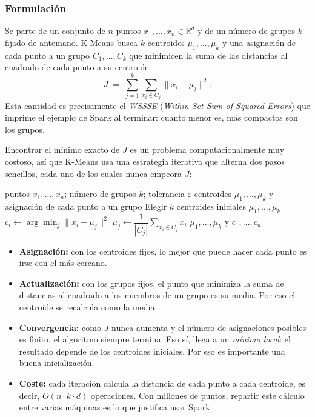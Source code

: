 \documentclass[11pt,a4paper]{article}
\begin{document}
\subsubsection*{Formulación}

Se parte de un conjunto de $n$ puntos $x_1,\dots,x_n \in \mathbb{R}^d$ y de un número de grupos $k$ fijado de antemano. K-Means busca $k$ centroides $\mu_1,\dots,\mu_k$ y una asignación de cada punto a un grupo $C_1,\dots,C_k$ que minimicen la suma de las distancias al cuadrado de cada punto a su centroide:
\[
  J \;=\; \sum_{j=1}^{k} \sum_{x_i \in C_j} \lVert x_i - \mu_j \rVert^2 .
\]
Esta cantidad es precisamente el \emph{WSSSE} (\emph{Within Set Sum of Squared Errors}) que imprime el ejemplo de Spark al terminar: cuanto menor es, más compactos son los grupos.

Encontrar el mínimo exacto de $J$ es un problema computacionalmente muy costoso, así que K-Means usa una estrategia iterativa que alterna dos pasos sencillos, cada uno de los cuales nunca empeora $J$:

\begin{algorithm}[htbp]
\caption{K-Means}\label{alg:kmeans}
\begin{algorithmic}[1]
\Require puntos $x_1,\dots,x_n$; número de grupos $k$; tolerancia $\varepsilon$
\Ensure centroides $\mu_1,\dots,\mu_k$ y asignación de cada punto a un grupo
\State Elegir $k$ centroides iniciales $\mu_1,\dots,\mu_k$
\Repeat
   
    \State $c_i \gets \arg\min_{j} \lVert x_i - \mu_j \rVert^2$
  \EndFor
   
    \State $\mu_j \gets \dfrac{1}{|C_j|} \displaystyle\sum_{x_i \in C_j} x_i$
  \EndFor
{}
\State \Return $\mu_1,\dots,\mu_k$ y $c_1,\dots,c_n$
\end{algorithmic}
\end{algorithm}

\begin{itemize}
  \item \textbf{Asignación:} con los centroides fijos, lo mejor que puede hacer cada punto es irse con el más cercano.
  \item \textbf{Actualización:} con los grupos fijos, el punto que minimiza la suma de distancias al cuadrado a los miembros de un grupo es su media. Por eso el centroide se recalcula como la media.
  \item \textbf{Convergencia:} como $J$ nunca aumenta y el número de asignaciones posibles es finito, el algoritmo siempre termina. Eso sí, llega a un \emph{mínimo local}: el resultado depende de los centroides iniciales. Por eso es importante una buena inicialización.
  \item \textbf{Coste:} cada iteración calcula la distancia de cada punto a cada centroide, es decir, $O(n \cdot k \cdot d)$ operaciones. Con millones de puntos, repartir este cálculo entre varias máquinas es lo que justifica usar Spark.
\end{itemize}
\end{document}
